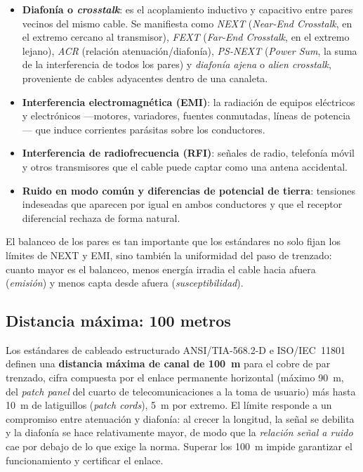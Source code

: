 \documentclass[11pt,a4paper]{article}
\begin{document}
\begin{itemize}
  \item \textbf{Diafonía o \textit{crosstalk}}: es el acoplamiento inductivo y
        capacitivo entre pares vecinos del mismo cable. Se manifiesta como
        \textit{NEXT} (\textit{Near-End Crosstalk}, en el extremo cercano al
        transmisor), \textit{FEXT} (\textit{Far-End Crosstalk}, en el extremo
        lejano), \textit{ACR} (relación atenuación/diafonía),
        \textit{PS-NEXT} (\textit{Power Sum}, la suma de la interferencia de
        todos los pares) y \textit{diafonía ajena} o \textit{alien crosstalk},
        proveniente de cables adyacentes dentro de una canaleta.
  \item \textbf{Interferencia electromagnética (EMI)}: la radiación de
        equipos eléctricos y electrónicos —motores, variadores, fuentes
        conmutadas, líneas de potencia— que induce corrientes parásitas sobre
        los conductores.
  \item \textbf{Interferencia de radiofrecuencia (RFI)}: señales de radio,
        telefonía móvil y otros transmisores que el cable puede captar como
        una antena accidental.
  \item \textbf{Ruido en modo común y diferencias de potencial de tierra}:
        tensiones indeseadas que aparecen por igual en ambos conductores y
        que el receptor diferencial rechaza de forma natural.
\end{itemize}

El balanceo de los pares es tan importante que los estándares no solo fijan
los límites de NEXT y EMI, sino también la uniformidad del paso de trenzado:
cuanto mayor es el balanceo, menos energía irradia el cable hacia afuera
(\textit{emisión}) y menos capta desde afuera (\textit{susceptibilidad}).

\subsection{Distancia máxima: 100 metros}

Los estándares de cableado estructurado ANSI/TIA-568.2-D e ISO/IEC~11801
definen una \textbf{distancia máxima de canal de 100~m} para el cobre de par
trenzado, cifra compuesta por el enlace permanente horizontal (máximo 90~m,
del \textit{patch panel} del cuarto de telecomunicaciones a la toma de
usuario) más hasta 10~m de latiguillos (\textit{patch cords}), 5~m por
extremo. El límite responde a un compromiso entre atenuación y diafonía: al
crecer la longitud, la señal se debilita y la diafonía se hace relativamente
mayor, de modo que la \textit{relación señal a ruido} cae por debajo de lo que
exige la norma. Superar los 100~m impide garantizar el funcionamiento y
certificar el enlace.
\end{document}
